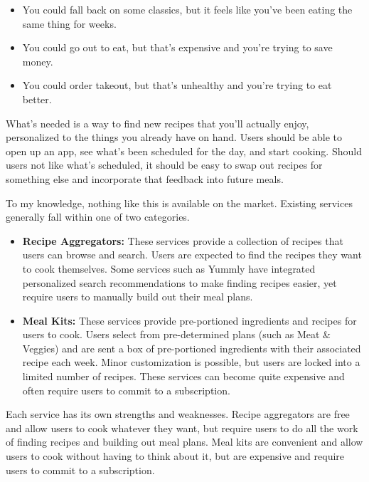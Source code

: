 \documentclass{article}
\begin{document}
\begin{itemize}
  \item You could fall back on some classics, but it feels like you've been eating the same thing for weeks.
  \item You could go out to eat, but that's expensive and you're trying to save money.
  \item You could order takeout, but that's unhealthy and you're trying to eat better.
\end{itemize}

What's needed is a way to find new recipes that you'll actually enjoy, personalized to the things you already have on hand. Users should be able to open up an app, see what's been scheduled for the day, and start cooking. Should users not like what's scheduled, it should be easy to swap out recipes for something else and incorporate that feedback into future meals.

To my knowledge, nothing like this is available on the market. Existing services generally fall within one of two categories.

\begin{itemize}

  \item \textbf{Recipe Aggregators:} These services provide a collection of recipes that users can browse and search. Users are expected to find the recipes they want to cook themselves. Some services such as Yummly have integrated personalized search recommendations to make finding recipes easier, yet require users to manually build out their meal plans.
        
  \item \textbf{Meal Kits:} These services provide pre-portioned ingredients and recipes for users to cook. Users select from pre-determined plans (such as Meat \& Veggies) and are sent a box of pre-portioned ingredients with their associated recipe each week. Minor customization is possible, but users are locked into a limited number of recipes. These services can become quite expensive and often require users to commit to a subscription.
        
\end{itemize}

Each service has its own strengths and weaknesses. Recipe aggregators are free and allow users to cook whatever they want, but require users to do all the work of finding recipes and building out meal plans. Meal kits are convenient and allow users to cook without having to think about it, but are expensive and require users to commit to a subscription.
\end{document}
